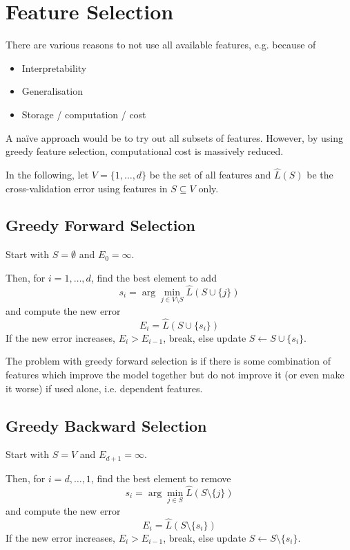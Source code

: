 \section{Feature Selection}
There are various reasons to
not use all available features, e.g. because of
\begin{itemize}
    \item Interpretability
    \item Generalisation
    \item Storage / computation / cost
\end{itemize}

A naïve approach would be to try out all subsets of
features.
However, by using greedy feature selection,
computational cost is massively reduced.

In the following,
let $V = \{1, \dotsc, d\}$ be the set of all features
and $\hat{L}(S)$ be the cross-validation error
using features in $S \subseteq V$ only.


\subsection{Greedy Forward Selection}
Start with $S = \emptyset$ and $E_0 = \infty$.

Then, for $i = 1, \dotsc, d$,
find the best element to add
\begin{equation*}
    s_i = \arg\min_{j \in V \setminus S}{
        \hat{L}(S \cup \{j\})
    }
\end{equation*}
and compute the new error
\begin{equation*}
    E_i = \hat{L}(S \cup \{s_i\})
\end{equation*}
If the new error increases, $E_i > E_{i-1}$,
break, else update $S \gets S \cup \{s_i\}$.

The problem with greedy forward selection is if there is
some combination of features which improve the model together
but do not improve it (or even make it worse) if used alone,
i.e. dependent features.


\subsection{Greedy Backward Selection}
Start with $S = V$ and $E_{d + 1} = \infty$.

Then, for $i = d, \dotsc, 1$,
find the best element to remove
\begin{equation*}
    s_i = \arg\min_{j \in S}{
        \hat{L}(S \setminus \{j\})
    }
\end{equation*}
and compute the new error
\begin{equation*}
    E_i = \hat{L}(S \setminus \{s_i\})
\end{equation*}
If the new error increases, $E_i > E_{i-1}$,
break, else update $S \gets S \setminus \{s_i\}$.


